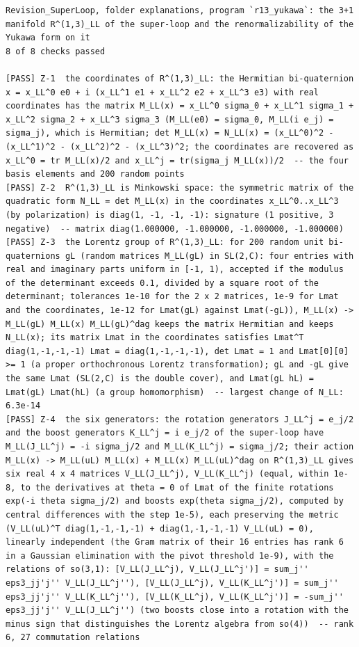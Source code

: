 \documentclass[
  10pt,
]{article}
\begin{document}
\begin{verbatim}
Revision_SuperLoop, folder explanations, program `r13_yukawa`: the 3+1 manifold R^(1,3)_LL of the super-loop and the renormalizability of the Yukawa form on it
8 of 8 checks passed

[PASS] Z-1  the coordinates of R^(1,3)_LL: the Hermitian bi-quaternion x = x_LL^0 e0 + i (x_LL^1 e1 + x_LL^2 e2 + x_LL^3 e3) with real coordinates has the matrix M_LL(x) = x_LL^0 sigma_0 + x_LL^1 sigma_1 + x_LL^2 sigma_2 + x_LL^3 sigma_3 (M_LL(e0) = sigma_0, M_LL(i e_j) = sigma_j), which is Hermitian; det M_LL(x) = N_LL(x) = (x_LL^0)^2 - (x_LL^1)^2 - (x_LL^2)^2 - (x_LL^3)^2; the coordinates are recovered as x_LL^0 = tr M_LL(x)/2 and x_LL^j = tr(sigma_j M_LL(x))/2  -- the four basis elements and 200 random points
[PASS] Z-2  R^(1,3)_LL is Minkowski space: the symmetric matrix of the quadratic form N_LL = det M_LL(x) in the coordinates x_LL^0..x_LL^3 (by polarization) is diag(1, -1, -1, -1): signature (1 positive, 3 negative)  -- matrix diag(1.000000, -1.000000, -1.000000, -1.000000)
[PASS] Z-3  the Lorentz group of R^(1,3)_LL: for 200 random unit bi-quaternions gL (random matrices M_LL(gL) in SL(2,C): four entries with real and imaginary parts uniform in [-1, 1), accepted if the modulus of the determinant exceeds 0.1, divided by a square root of the determinant; tolerances 1e-10 for the 2 x 2 matrices, 1e-9 for Lmat and the coordinates, 1e-12 for Lmat(gL) against Lmat(-gL)), M_LL(x) -> M_LL(gL) M_LL(x) M_LL(gL)^dag keeps the matrix Hermitian and keeps N_LL(x); its matrix Lmat in the coordinates satisfies Lmat^T diag(1,-1,-1,-1) Lmat = diag(1,-1,-1,-1), det Lmat = 1 and Lmat[0][0] >= 1 (a proper orthochronous Lorentz transformation); gL and -gL give the same Lmat (SL(2,C) is the double cover), and Lmat(gL hL) = Lmat(gL) Lmat(hL) (a group homomorphism)  -- largest change of N_LL: 6.3e-14
[PASS] Z-4  the six generators: the rotation generators J_LL^j = e_j/2 and the boost generators K_LL^j = i e_j/2 of the super-loop have M_LL(J_LL^j) = -i sigma_j/2 and M_LL(K_LL^j) = sigma_j/2; their action M_LL(x) -> M_LL(uL) M_LL(x) + M_LL(x) M_LL(uL)^dag on R^(1,3)_LL gives six real 4 x 4 matrices V_LL(J_LL^j), V_LL(K_LL^j) (equal, within 1e-8, to the derivatives at theta = 0 of Lmat of the finite rotations exp(-i theta sigma_j/2) and boosts exp(theta sigma_j/2), computed by central differences with the step 1e-5), each preserving the metric (V_LL(uL)^T diag(1,-1,-1,-1) + diag(1,-1,-1,-1) V_LL(uL) = 0), linearly independent (the Gram matrix of their 16 entries has rank 6 in a Gaussian elimination with the pivot threshold 1e-9), with the relations of so(3,1): [V_LL(J_LL^j), V_LL(J_LL^j')] = sum_j'' eps3_jj'j'' V_LL(J_LL^j''), [V_LL(J_LL^j), V_LL(K_LL^j')] = sum_j'' eps3_jj'j'' V_LL(K_LL^j''), [V_LL(K_LL^j), V_LL(K_LL^j')] = -sum_j'' eps3_jj'j'' V_LL(J_LL^j'') (two boosts close into a rotation with the minus sign that distinguishes the Lorentz algebra from so(4))  -- rank 6, 27 commutation relations

\end{verbatim}
\end{document}
